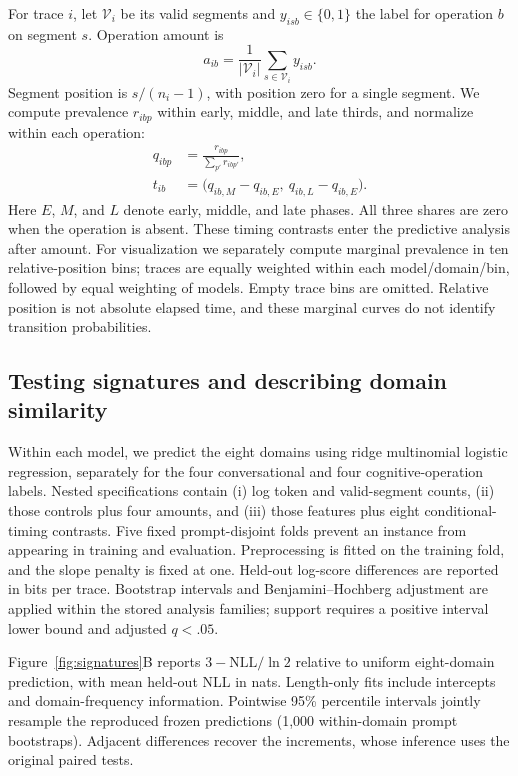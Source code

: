 For trace $i$, let $\mathcal V_i$ be its valid segments and $y_{isb}\in\{0,1\}$ the label for operation $b$ on segment $s$. Operation amount is
\begin{equation}
a_{ib}=\frac{1}{|\mathcal V_i|}\sum_{s\in\mathcal V_i}y_{isb}.
\end{equation}
Segment position is $s/(n_i-1)$, with position zero for a single segment. We compute prevalence $r_{ibp}$ within early, middle, and late thirds, and normalize within each operation:
\begin{equation}
\begin{aligned}
q_{ibp}&=\frac{r_{ibp}}{\sum_{p'}r_{ibp'}},\\
t_{ib}&=\big(q_{ib,M}-q_{ib,E},\ q_{ib,L}-q_{ib,E}\big).
\end{aligned}
\end{equation}
Here $E$, $M$, and $L$ denote early, middle, and late phases. All three shares are zero when the operation is absent. These timing contrasts enter the predictive analysis after amount. For visualization we separately compute marginal prevalence in ten relative-position bins; traces are equally weighted within each model/domain/bin, followed by equal weighting of models. Empty trace bins are omitted. Relative position is not absolute elapsed time, and these marginal curves do not identify transition probabilities.

\subsection{Testing signatures and describing domain similarity}
Within each model, we predict the eight domains using ridge multinomial logistic regression, separately for the four conversational and four cognitive-operation labels. Nested specifications contain (i) log token and valid-segment counts, (ii) those controls plus four amounts, and (iii) those features plus eight conditional-timing contrasts. Five fixed prompt-disjoint folds prevent an instance from appearing in training and evaluation. Preprocessing is fitted on the training fold, and the slope penalty is fixed at one. Held-out log-score differences are reported in bits per trace. Bootstrap intervals and Benjamini--Hochberg adjustment are applied within the stored analysis families; support requires a positive interval lower bound and adjusted $q<.05$.

Figure~\ref{fig:signatures}B reports $3-\mathrm{NLL}/\ln 2$ relative to uniform eight-domain prediction, with mean held-out NLL in nats. Length-only fits include intercepts and domain-frequency information. Pointwise 95\% percentile intervals jointly resample the reproduced frozen predictions (1,000 within-domain prompt bootstraps). Adjacent differences recover the increments, whose inference uses the original paired tests.

